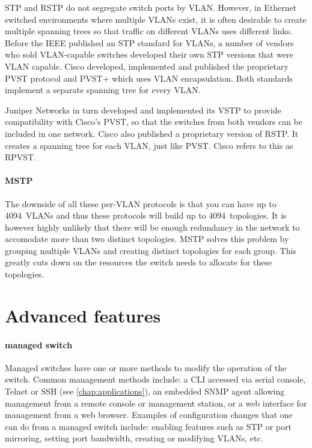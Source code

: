 \acs{STP} and \acs{RSTP} do not segregate switch ports by \acs{VLAN}.
However, in Ethernet switched environments where multiple \acsp{VLAN} exist, it is often desirable to create multiple spanning trees so that traffic on different \acsp{VLAN} uses different links.
Before the \acs{IEEE} published an \acs{STP} standard for \acsp{VLAN}, a number of vendors who sold \acs{VLAN}-capable switches developed their own \acs{STP} versions that were \acs{VLAN} capable.
Cisco developed, implemented and published the proprietary \acf{PVST} protocol and \acs{PVST+} which uses  \acs{VLAN} encapsulation.
Both standards implement a separate spanning tree for every \acs{VLAN}.

Juniper Networks in turn developed and implemented its \acf{VSTP} to provide compatibility with Cisco's \acs{PVST}, so that the switches from both vendors can be included in one network.
Cisco also published a proprietary version of \acf{RSTP}.
It creates a spanning tree for each \acs{VLAN}, just like \acs{PVST}.
Cisco refers to this as \acf{RPVST}.


\paragraph{\acf{MSTP}}
The downside of all these per-\acs{VLAN} protocols is that you can have up to 4094~\acsp{VLAN} and thus these protocols will build up to 4094~topologies.
It is however highly unlikely that there will be enough redundancy in the network to accomodate more than two distinct topologies.
\acs{MSTP} solves this problem by grouping multiple \acsp{VLAN} and creating distinct topologies for each group.
This greatly cuts down on the resources the switch needs to allocate for these topologies.


\section{Advanced features}
\label{sec:ethernet-advanced-features}

\paragraph{managed switch}
\label{par:ethernet-switch-managed}
Managed switches have one or more methods to modify the operation of the switch.
Common management methods include: a \ac{CLI} accessed via serial console, Telnet or \ac{SSH} (see \vref{chap:applications}), an embedded \ac{SNMP} agent allowing management from a remote console or management station, or a web interface for management from a web browser.
Examples of configuration changes that one can do from a managed switch include: enabling features such as \ac{STP} or port mirroring, setting port bandwidth, creating or modifying \acp{VLAN}, etc.

